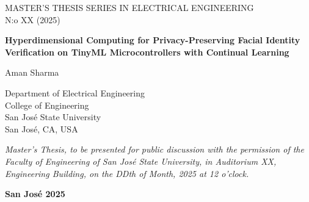 \documentclass[a4paper,12pt]{article}
\begin{document}
\pagestyle{empty}

\begin{center}
MASTER'S THESIS SERIES IN ELECTRICAL ENGINEERING \\

N:o XX (2025) \\

\vspace*{3cm}

{\Large \textbf{Hyperdimensional Computing for Privacy-Preserving Facial Identity Verification on TinyML Microcontrollers with Continual Learning}
\\
}

\vspace*{2cm}

{\large
Aman Sharma \\
}

\vspace*{2cm}
Department of Electrical Engineering \\
College of Engineering \\
San José State University \\
San José, CA, USA

\vspace*{2cm}

{\em Master's Thesis, to be presented for public discussion with the permission of the Faculty of Engineering
of San José State University, in Auditorium XX, Engineering Building, on the DDth of Month, 2025 at 12 o'clock.}

\vspace*{1cm}

{\bf San José 2025}

\newpage
\vspace*{-2.2cm}


\end{center}
\end{document}
